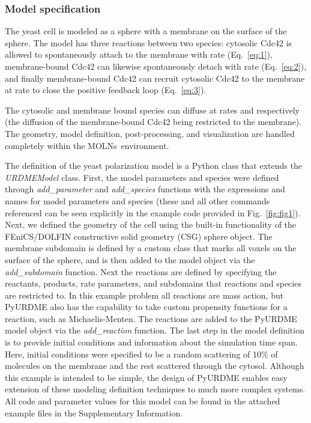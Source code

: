 \documentclass[final,leqno,onefignum,onetabnum]{siamltex1213}
\def\packagename {MOLNs}
\begin{document}
\subsubsection{Model specification}

The yeast cell is modeled as a sphere with a membrane on the surface of the sphere. The model has three reactions between two species: cytosolic Cdc42 is allowed to spontaneously attach to the membrane with rate  (Eq.~\ref{eq:1}), membrane-bound Cdc42 can likewise spontaneously detach with  rate  (Eq.~\ref{eq:2}), and finally membrane-bound Cdc42 can recruit cytosolic Cdc42 to the membrane at rate  to close the positive feedback loop (Eq.~\ref{eq:3}).

The cytosolic and membrane bound species can diffuse at rates  and  respectively (the diffusion of the membrane-bound Cdc42 being restricted to the membrane). The geometry, model definition, post-processing, and visualization are handled completely within the \packagename~environment.



The definition of the yeast polarization model is a Python class that extends the \emph{URDMEModel} class.
First, the model parameters and species were defined through \emph{add\_parameter} and \emph{add\_species} functions with the expressions and names for model parameters and species (these and all other commands referenced can be seen explicitly in the example code provided in Fig.~\ref{fig:fig1}).
Next, we defined the geometry of the cell using the built-in functionality of the FEniCS/DOLFIN \cite{LoggMardalEtAl2012a, dolfin} constructive solid geometry (CSG) sphere object.  
The membrane subdomain is defined by a custom class that marks all voxels on the surface of the sphere, and is then added to the model object via the \emph{add\_subdomain} function.
Next the reactions are defined by specifying the reactants, products, rate parameters, and subdomains that reactions and species are restricted to. In this example problem all reactions are mass action, but PyURDME also has the capability to take custom propensity functions for a reaction, such as Michaelis-Menten. The reactions are added to the PyURDME model object via the \emph{add\_reaction} function.
The last step in the model definition is to provide initial conditions and information about the simulation time span. Here, initial conditions were specified to be a random scattering of 10\% of molecules on the membrane and the rest scattered through the cytosol. 
Although this example is intended to be simple, the design of PyURDME enables easy extension of these modeling definition techniques to much more complex systems. All code and parameter values for this model can be found in the attached example files in the Supplementary Information. 
\end{document}
